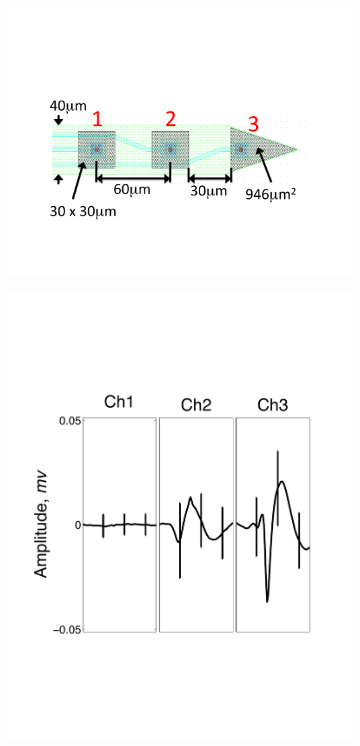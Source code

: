 \begin{center}
\begin{figure}
\begin{subfigure}[b]{.24\textwidth}
\includegraphics[width=\textwidth]{../figs/3dev}
\caption{}
\label{3dev}
\end{subfigure}
\begin{subfigure}[b]{.24\textwidth}
\includegraphics[width=\textwidth]{../figs/3devim/clus1}

\end{subfigure}
\end{figure}
\end{center}
